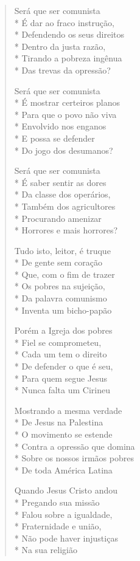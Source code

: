 \begin{verse}
Será que ser comunista\\*
É dar ao fraco instrução,\\*
Defendendo os seus direitos\\*
Dentro da justa razão,\\*
Tirando a pobreza ingênua\\*
Das trevas da opressão?

Será que ser comunista\\*
É mostrar certeiros planos\\*
Para que o povo não viva\\*
Envolvido nos enganos\\*
E possa se defender\\*
Do jogo dos desumanos?

Será que ser comunista\\*
É saber sentir as dores\\*
Da classe dos operários,\\*
Também dos agricultores\\*
Procurando amenizar\\*
Horrores e mais horrores?

Tudo isto, leitor, é truque\\*
De gente sem coração\\*
Que, com o fim de trazer\\*
Os pobres na sujeição,\\*
Da palavra comunismo\\*
Inventa um bicho-papão

Porém a Igreja dos pobres\\*
Fiel se comprometeu,\\*
Cada um tem o direito\\*
De defender o que é seu,\\*
Para quem segue Jesus\\*
Nunca falta um Cirineu

Mostrando a mesma verdade\\*
De Jesus na Palestina\\*
O movimento se estende\\*
Contra a opressão que domina\\*
Sobre os nossos irmãos pobres\\*
De toda América Latina

Quando Jesus Cristo andou\\*
Pregando sua missão\\*
Falou sobre a igualdade,\\*
Fraternidade e união,\\*
Não pode haver injustiças\\*
Na sua religião


\end{verse}
